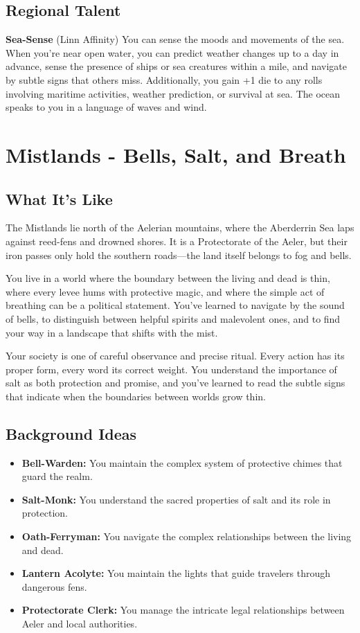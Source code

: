 \documentclass[11pt]{article}
\newcommand{\region}[1]{\section*{#1}}
\newcommand{\subregion}[1]{\subsection*{#1}}
\begin{document}
\begin{multicols}{2}
\subregion{Regional Talent}

\textbf{Sea-Sense} (Linn Affinity)
You can sense the moods and movements of the sea. When you're near open water, you can predict weather changes up to a day in advance, sense the presence of ships or sea creatures within a mile, and navigate by subtle signs that others miss. Additionally, you gain +1 die to any rolls involving maritime activities, weather prediction, or survival at sea. The ocean speaks to you in a language of waves and wind.

\end{multicols}

\region{Mistlands - Bells, Salt, and Breath}

\begin{multicols}{2}
\subregion{What It's Like}

The Mistlands lie north of the Aelerian mountains, where the Aberderrin Sea laps against reed-fens and drowned shores. It is a Protectorate of the Aeler, but their iron passes only hold the southern roads—the land itself belongs to fog and bells.

You live in a world where the boundary between the living and dead is thin, where every levee hums with protective magic, and where the simple act of breathing can be a political statement. You've learned to navigate by the sound of bells, to distinguish between helpful spirits and malevolent ones, and to find your way in a landscape that shifts with the mist.

Your society is one of careful observance and precise ritual. Every action has its proper form, every word its correct weight. You understand the importance of salt as both protection and promise, and you've learned to read the subtle signs that indicate when the boundaries between worlds grow thin.

\columnbreak

\subregion{Background Ideas}

\begin{itemize}[leftmargin=*]
    \item \textbf{Bell-Warden:} You maintain the complex system of protective chimes that guard the realm.
    \item \textbf{Salt-Monk:} You understand the sacred properties of salt and its role in protection.
    \item \textbf{Oath-Ferryman:} You navigate the complex relationships between the living and dead.
    \item \textbf{Lantern Acolyte:} You maintain the lights that guide travelers through dangerous fens.
    \item \textbf{Protectorate Clerk:} You manage the intricate legal relationships between Aeler and local authorities.
\end{itemize}


\end{multicols}
\end{document}
